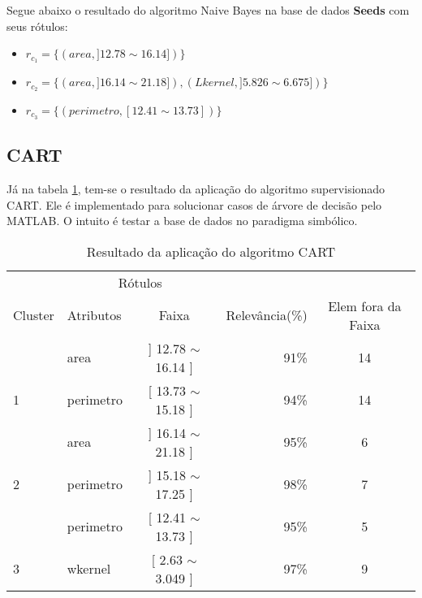 Segue abaixo o resultado do algoritmo Naive Bayes na base de dados \textbf{Seeds} com seus rótulos: 
\begin{itemize}[noitemsep]
 \item ${r_{c_1}=\{ (area, ]12.78 \sim 16.14]) \} }$  
 \item ${r_{c_2}=\{ (area, ]16.14 \sim 21.18]), (Lkernel, ]5.826 \sim 6.675]) \} }$
 \item ${r_{c_3}=\{ (perimetro, [12.41 \sim 13.73])\} }$
\end{itemize}


\subsection{CART}\label{cap:resultados:ssec:seed:cart}


Já na tabela \ref{tab:rot:seeds:cart}, tem-se o resultado da aplicação do algoritmo supervisionado CART. Ele é implementado para solucionar casos de árvore de decisão pelo MATLAB. O intuito é testar a base de dados no paradigma simbólico. 

\begin{table}[!h]
\centering
\caption{Resultado da aplicação do algoritmo CART}
\label{tab:rot:seeds:cart}
\begin{tabular}{llcrc}\hline

\multicolumn{1}{c}{\cellcolor[HTML]{FFFFFF}} & \multicolumn{2}{c}{Rótulos}                      & \multicolumn{1}{r}{}            \\ \cline{2-3}
Cluster                                      & Atributos      & \multicolumn{1}{c}{Faixa}       & \multicolumn{1}{c}{Relevância(\%)} & Elem fora da Faixa \\ \hline \hline
                                             & area           & ] 12.78 $\sim$  16.14 ]         & 91\%          & 14 \\  
\multirow{-2}{*}{1}                          & perimetro      & [ 13.73 $\sim$ 15.18 ]          & 94\%          & 14\\ \hline
                                             & area           & ] 16.14 $\sim$  21.18 ]          & 95\%         & 6 \\ 
\multirow{-2}{*}{2}                          & perimetro      & ] 15.18 $\sim$  17.25 ]          & 98\%         & 7\\  \hline
                                             & perimetro      & [ 12.41 $\sim$  13.73 ]         & 95\%          & 5 \\
\multirow{-2}{*}{3}                          & wkernel        & [ 2.63 $\sim$  3.049 ]         & 97\%           & 9\\ \hline \hline
\end{tabular}
\end{table}

